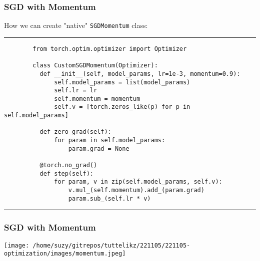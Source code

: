 \documentclass{beamer}
\begin{document}
    \begin{frame}[fragile]
      \frametitle{SGD with Momentum}
      \vspace{0.2cm}
      How we can create "native" \verb|SGDMomentum| class:
      \rule{\textwidth}{1pt}
      \scriptsize
      \begin{verbatim}
        from torch.optim.optimizer import Optimizer

        class CustomSGDMomentum(Optimizer):
          def __init__(self, model_params, lr=1e-3, momentum=0.9):
              self.model_params = list(model_params)
              self.lr = lr
              self.momentum = momentum
              self.v = [torch.zeros_like(p) for p in self.model_params]

          def zero_grad(self):
              for param in self.model_params:
                  param.grad = None

          @torch.no_grad()
          def step(self):
              for param, v in zip(self.model_params, self.v):
                  v.mul_(self.momentum).add_(param.grad)
                  param.sub_(self.lr * v)
      \end{verbatim}
      \rule{\textwidth}{1pt}
    \end{frame}



    \begin{frame}
      \begin{center}
      \frametitle{SGD with Momentum}
      \texttt{[image: /home/suzy/gitrepos/tuttelikz/221105/221105-optimization/images/momentum.jpeg]}
      \end{center}
    \end{frame}
\end{document}
